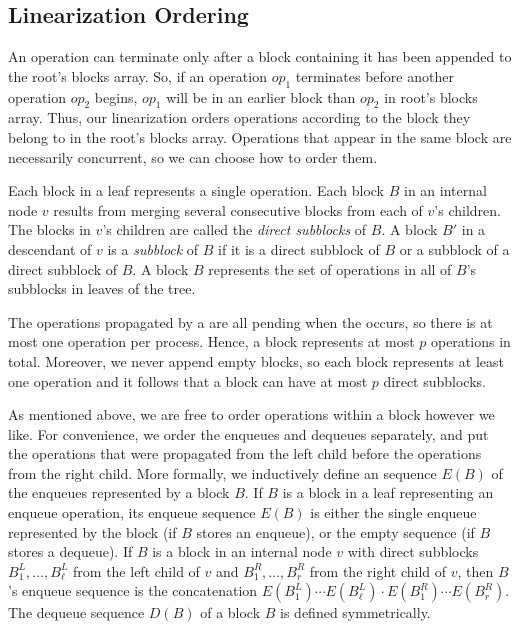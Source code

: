 \subsection{Linearization Ordering}

An operation can terminate only after a block containing it has been appended to the root's blocks array.
So, if an operation $op_1$ terminates before another operation $op_2$ begins, 
$op_1$ will be in an earlier block than $op_2$ in root's blocks array.
Thus, our linearization orders operations according to the block they belong to in the root's blocks array.
Operations that appear in the same block are necessarily concurrent, so we can choose how to order them.

Each block in a leaf represents a single operation.
Each block $B$ in an internal node $v$ results from merging
several consecutive blocks from each of $v$'s children.
The blocks in $v$'s children are called the \emph{direct subblocks} of $B$.
A block $B'$ in a descendant of $v$ is a \emph{subblock} of $B$ if it is a direct subblock of $B$
or a subblock of a direct subblock of $B$.
A block $B$ represents the set of operations in all of $B$'s subblocks in leaves of the tree.

The operations propagated by a  are all pending when the  occurs,
so there is at most one operation per process.
Hence, a block represents at most $p$ operations in total.  
Moreover, we never append empty blocks, so 
each block represents at least one operation and it follows that a block can have at most $p$ direct subblocks.

As mentioned above, we are free to order operations within a block however we like.
For convenience, we order the enqueues and dequeues separately, and put the 
operations that were propagated from the left child before the operations from the right child.
More formally, we inductively define an sequence $E(B)$ of the enqueues represented by a block $B$.
If $B$ is a block in a leaf representing an enqueue operation, its enqueue sequence $E(B)$ is either the single
enqueue represented by the block (if $B$ stores an enqueue), or the empty sequence (if $B$ stores a dequeue).
If $B$ is a block in an internal node $v$ with direct subblocks $B^L_1, \ldots, B^L_\ell$ from the left child of $v$
and $B^R_1,\ldots,B^R_r$ from the right child of $v$, then $B$'s enqueue sequence is the concatenation $E(B^L_1)\cdots E(B^L_\ell)\cdot E(B^R_1) \cdots E(B^R_r)$.
The dequeue sequence $D(B)$ of a block $B$ is defined symmetrically.

